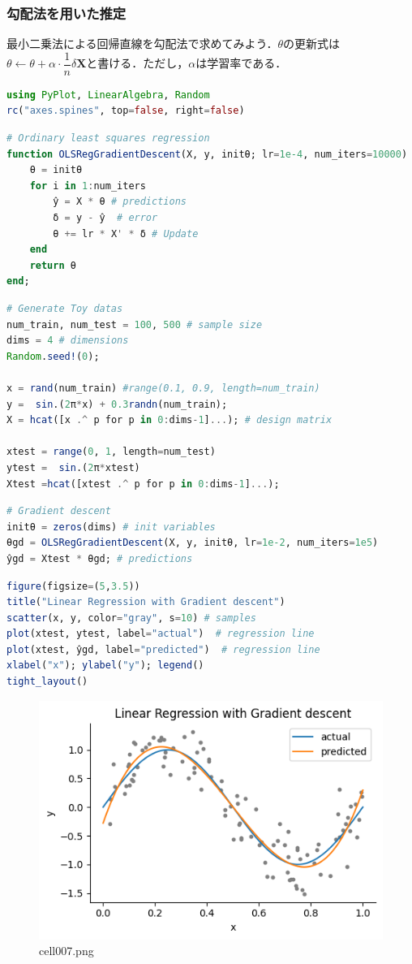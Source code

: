 \subsubsection{勾配法を用いた推定}
最小二乗法による回帰直線を勾配法で求めてみよう．$\theta$の更新式は$\theta \leftarrow \theta + \alpha\cdot \dfrac{1}{n} \delta \mathbf{X}$と書ける．ただし，$\alpha$は学習率である．
\begin{lstlisting}[language=julia]
using PyPlot, LinearAlgebra, Random
rc("axes.spines", top=false, right=false)
\end{lstlisting}
\begin{lstlisting}[language=julia]
# Ordinary least squares regression
function OLSRegGradientDescent(X, y, initθ; lr=1e-4, num_iters=10000)
    θ = initθ
    for i in 1:num_iters
        ŷ = X * θ # predictions
        δ = y - ŷ  # error
        θ += lr * X' * δ # Update
    end
    return θ
end;
\end{lstlisting}
\begin{lstlisting}[language=julia]
# Generate Toy datas
num_train, num_test = 100, 500 # sample size
dims = 4 # dimensions
Random.seed!(0);

x = rand(num_train) #range(0.1, 0.9, length=num_train)
y =  sin.(2π*x) + 0.3randn(num_train);
X = hcat([x .^ p for p in 0:dims-1]...); # design matrix

xtest = range(0, 1, length=num_test)
ytest =  sin.(2π*xtest)
Xtest =hcat([xtest .^ p for p in 0:dims-1]...);
\end{lstlisting}
\begin{lstlisting}[language=julia]
# Gradient descent
initθ = zeros(dims) # init variables
θgd = OLSRegGradientDescent(X, y, initθ, lr=1e-2, num_iters=1e5)
ŷgd = Xtest * θgd; # predictions
\end{lstlisting}
\begin{lstlisting}[language=julia]
figure(figsize=(5,3.5))
title("Linear Regression with Gradient descent")
scatter(x, y, color="gray", s=10) # samples
plot(xtest, ytest, label="actual")  # regression line
plot(xtest, ŷgd, label="predicted")  # regression line
xlabel("x"); ylabel("y"); legend()
tight_layout()
\end{lstlisting}
\begin{figure}[ht]
	\centering
	\includegraphics[scale=0.8, max width=\linewidth]{./fig/introduction/linear-regression/cell007.png}
	\caption{cell007.png}
	\label{cell007.png}
\end{figure}
